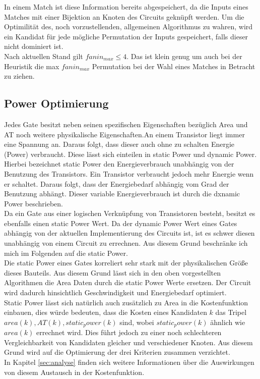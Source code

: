 \documentclass[11pt, a4paper, german]{article}
\begin{document}
In einem Match ist diese Information bereits abgespeichert, da die Inputs eines Matches mit einer Bijektion an Knoten des Circuits geknüpft werden. Um die Optimilität des, noch vorzustellenden, allgemeinen Algorithmus zu wahren, wird ein Kandidat für jede mögliche Permutation der Inputs gespeichert, falls dieser nicht dominiert ist.\\
Nach aktuellen Stand gilt $fanin_{max} \leq 4$. Das ist klein genug um auch bei der Heuristik die max $fanin_{max}$ Permutation bei der Wahl eines Matches in Betracht zu ziehen. 

\subsection{Power Optimierung}
Jedes Gate besitzt neben seinen spezifischen Eigenschaften bezüglich Area und AT noch weitere physikalische Eigenschaften.An einem Transistor liegt immer eine Spannung an. Daraus folgt, dass dieser auch ohne zu schalten Energie (Power) verbraucht. Diese lässt sich einteilen in static Power und dynamic Power. Hierbei bezeichnet static Power den Energieverbrauch unabhängig von der Benutzung des Transistors. Ein Transistor verbraucht jedoch mehr Energie wenn er schaltet. Daraus folgt, dass der Energiebedarf abhängig vom Grad der Benutzung abhängt. Dieser variable Energieverbrauch ist durch die dxnamic Power beschrieben.\\
Da ein Gate aus einer logischen Verknüpfung von Transistoren besteht, besitzt es ebenfalls einen static Power Wert. Da der dynamic Power Wert eines Gates abhängig von der aktuellen Implementierung des Circuits ist, ist es schwer diesen unabhängig von einem Circuit zu errechnen. Aus diesem Grund beschränke ich mich im Folgenden auf die static Power. \\
Die static Power eines Gates korreliert sehr stark mit der physikalischen Größe dieses Bauteils. Aus diesem Grund lässt sich in den oben vorgestellten Algorithmen die Area Daten durch die static Power Werte ersetzen. Der Circuit wird dadurch hinsichtlich Geschwindigkeit und Energiebedarf optimiert. \\
Static Power lässt sich natürlich auch zusätzlich zu Area in die Kostenfunktion einbauen, dies würde bedeuten, dass die Kosten eines Kandidaten $k$ das Tripel $area(k), AT(k), static_power(k)$ sind, wobei $static_power(k)$ ähnlich wie $area(k)$ errechnet wird. Dies führt jedoch zu einer noch schlechteren Vergleichbarkeit von Kandidaten gleicher und verschiedener Knoten. Aus diesem Grund wird auf die Optimierung der drei Kriterien zusammen verzichtet. \\
In Kapitel \ref{sec:analyse} finden sich weitere Informationen über die Auswirkungen von diesem Austausch in der Kostenfunktion.
	
\end{document}
